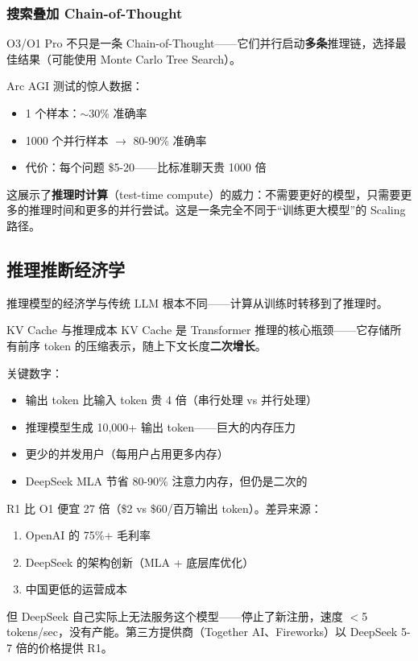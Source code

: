 \documentclass[a4paper]{article}
\begin{document}
\subsubsection{搜索叠加 Chain-of-Thought}

O3/O1 Pro 不只是一条 Chain-of-Thought——它们并行启动\textbf{多条}推理链，选择最佳结果（可能使用 Monte Carlo Tree Search）。

Arc AGI 测试的惊人数据：
\begin{itemize}
    \item 1 个样本：$\sim$30\% 准确率
    \item 1000 个并行样本 $\to$ 80-90\% 准确率
    \item 代价：每个问题 \$5-20——比标准聊天贵 1000 倍
\end{itemize}

这展示了\textbf{推理时计算}（test-time compute）的威力：不需要更好的模型，只需要更多的推理时间和更多的并行尝试。这是一条完全不同于``训练更大模型''的 Scaling 路径。

\subsection{推理推断经济学}

推理模型的经济学与传统 LLM 根本不同——计算从训练时转移到了推理时。

\begin{knowledgebox}{KV Cache 与推理成本}
KV Cache 是 Transformer 推理的核心瓶颈——它存储所有前序 token 的压缩表示，随上下文长度\textbf{二次增长}。

关键数字：
\begin{itemize}
    \item 输出 token 比输入 token 贵 4 倍（串行处理 vs 并行处理）
    \item 推理模型生成 10,000+ 输出 token——巨大的内存压力
    \item 更少的并发用户（每用户占用更多内存）
    \item DeepSeek MLA 节省 80-90\% 注意力内存，但仍是二次的
\end{itemize}

R1 比 O1 便宜 27 倍（\$2 vs \$60/百万输出 token）。差异来源：
\begin{enumerate}
    \item OpenAI 的 75\%+ 毛利率
    \item DeepSeek 的架构创新（MLA + 底层库优化）
    \item 中国更低的运营成本
\end{enumerate}

但 DeepSeek 自己实际上无法服务这个模型——停止了新注册，速度 $<$5 tokens/sec，没有产能。第三方提供商（Together AI、Fireworks）以 DeepSeek 5-7 倍的价格提供 R1。
\end{knowledgebox}
\end{document}
